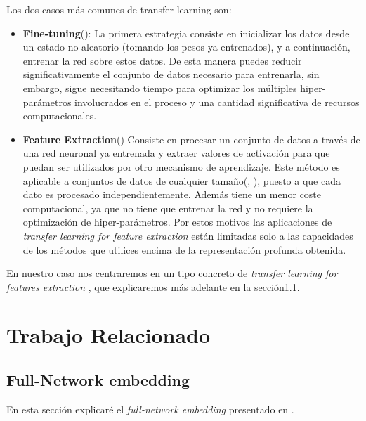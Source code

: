 \documentclass[12,twoside]{TFG-GM}
\theoremstyle{definition}
\theoremstyle{remark}
\begin{document}
Los dos casos más comunes de transfer learning son: 

\begin{itemize}
\item \textbf{Fine-tuning}(\cite{yosinski2014transferable}): La primera estrategia consiste en inicializar los datos desde un estado no aleatorio (tomando los pesos ya entrenados), y a continuación, entrenar la red sobre estos datos. 
De esta manera puedes reducir significativamente el conjunto de datos necesario para entrenarla, sin embargo, sigue necesitando tiempo para optimizar los múltiples hiper-parámetros involucrados en el proceso y una cantidad significativa de recursos computacionales. 


\item \textbf{Feature Extraction}(\cite{pan2010survey}) Consiste en procesar un conjunto de datos a través de una red neuronal ya entrenada y extraer valores de activación para que puedan ser utilizados por otro mecanismo de aprendizaje. Este método es aplicable a conjuntos de datos de cualquier tamaño(\cite{azizpour2016factors}, \cite{sharif2014cnn} ), puesto a que cada dato es procesado independientemente. Además tiene un menor coste computacional, ya que no tiene que entrenar la red y no requiere la optimización de hiper-parámetros. Por estos motivos las aplicaciones de \textit{transfer learning for feature extraction} están limitadas solo a las  capacidades de los métodos que utilices encima de la representación profunda obtenida. 


\end{itemize}

En nuestro caso nos centraremos en un tipo concreto de \textit{transfer learning for features extraction} \cite{behaviourcnn}, que explicaremos más adelante en la sección\ref{sec:fne}. 




\newpage

\section{Trabajo Relacionado}

\subsection{Full-Network embedding} \label{sec:fne}

En esta sección explicaré el \textit{full-network embedding} presentado en \cite{fne}.
\end{document}
